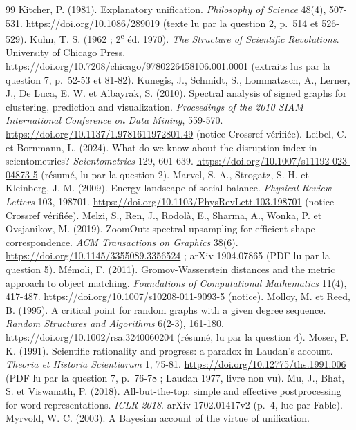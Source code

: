\documentclass[11pt,a4paper]{article}
\theoremstyle{definition}
\theoremstyle{plain}
\begin{document}
\begin{thebibliography}{99}
 Kitcher, P. (1981). Explanatory unification. \emph{Philosophy of Science} 48(4),
507-531. \url{https://doi.org/10.1086/289019} (texte lu par la question 2, p.~514 et 526-529).
 Kuhn, T. S. (1962 ; 2\textsuperscript{e} éd. 1970). \emph{The Structure of Scientific
Revolutions}. University of Chicago Press. \url{https://doi.org/10.7208/chicago/9780226458106.001.0001}
(extraits lus par la question 7, p.~52-53 et 81-82).
 Kunegis, J., Schmidt, S., Lommatzsch, A., Lerner, J., De Luca, E. W. et Albayrak,
S. (2010). Spectral analysis of signed graphs for clustering, prediction and visualization.
\emph{Proceedings of the 2010 SIAM International Conference on Data Mining}, 559-570.
\url{https://doi.org/10.1137/1.9781611972801.49} (notice Crossref vérifiée).
 Leibel, C. et Bornmann, L. (2024). What do we know about the disruption index in
scientometrics? \emph{Scientometrics} 129, 601-639. \url{https://doi.org/10.1007/s11192-023-04873-5}
(résumé, lu par la question 2).
 Marvel, S. A., Strogatz, S. H. et Kleinberg, J. M. (2009). Energy landscape of
social balance. \emph{Physical Review Letters} 103, 198701.
\url{https://doi.org/10.1103/PhysRevLett.103.198701} (notice Crossref vérifiée).
 Melzi, S., Ren, J., Rodolà, E., Sharma, A., Wonka, P. et Ovsjanikov, M. (2019).
ZoomOut: spectral upsampling for efficient shape correspondence. \emph{ACM Transactions on Graphics}
38(6). \url{https://doi.org/10.1145/3355089.3356524} ; arXiv 1904.07865 (PDF lu par la question 5).
 Mémoli, F. (2011). Gromov-Wasserstein distances and the metric approach to object
matching. \emph{Foundations of Computational Mathematics} 11(4), 417-487.
\url{https://doi.org/10.1007/s10208-011-9093-5} (notice).
 Molloy, M. et Reed, B. (1995). A critical point for random graphs with a given
degree sequence. \emph{Random Structures and Algorithms} 6(2-3), 161-180.
\url{https://doi.org/10.1002/rsa.3240060204} (résumé, lu par la question 4).
 Moser, P. K. (1991). Scientific rationality and progress: a paradox in Laudan's
account. \emph{Theoria et Historia Scientiarum} 1, 75-81. \url{https://doi.org/10.12775/ths.1991.006}
(PDF lu par la question 7, p.~76-78 ; Laudan 1977, livre non vu).
 Mu, J., Bhat, S. et Viswanath, P. (2018). All-but-the-top: simple and effective
postprocessing for word representations. \emph{ICLR 2018}. arXiv 1702.01417v2 (p.~4, lue par Fable).
 Myrvold, W. C. (2003). A Bayesian account of the virtue of unification.

\end{thebibliography}
\end{document}

